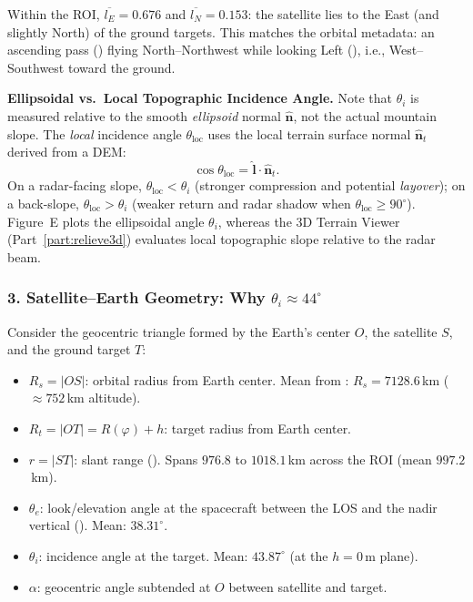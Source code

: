 \documentclass[11pt,a4paper]{article}
\begin{document}
Within the ROI, $\overline{l_E} = 0.676$ and $\overline{l_N} = 0.153$: the satellite lies to the East (and slightly North) of the ground targets. This matches the orbital metadata: an ascending pass () flying North--Northwest while looking Left (), i.e., West--Southwest toward the ground.

\textbf{Ellipsoidal vs.\ Local Topographic Incidence Angle.} Note that $\theta_i$ is measured relative to the smooth \emph{ellipsoid} normal $\hat{\mathbf{n}}$, not the actual mountain slope. The \emph{local} incidence angle $\theta_{\text{loc}}$ uses the local terrain surface normal $\hat{\mathbf{n}}_t$ derived from a DEM:
\begin{equation}
  \cos\theta_{\text{loc}} = \hat{\mathbf{l}}\cdot\hat{\mathbf{n}}_t .
\end{equation}
On a radar-facing slope, $\theta_{\text{loc}} < \theta_i$ (stronger compression and potential \emph{layover}); on a back-slope, $\theta_{\text{loc}} > \theta_i$ (weaker return and radar shadow when $\theta_{\text{loc}} \ge 90^\circ$). Figure~E plots the ellipsoidal angle $\theta_i$, whereas the 3D Terrain Viewer (Part~\ref{part:relieve3d}) evaluates local topographic slope relative to the radar beam.

\subsubsection*{3. Satellite--Earth Geometry: Why $\theta_i \approx 44^\circ$}
Consider the geocentric triangle formed by the Earth's center $O$, the satellite $S$, and the ground target $T$:
\begin{itemize}
  \item $R_s = |OS|$: orbital radius from Earth center. Mean from : $R_s = 7128.6$\,km ($\approx 752$\,km altitude).
  \item $R_t = |OT| = R(\varphi) + h$: target radius from Earth center.
  \item $r = |ST|$: slant range (). Spans $976.8$ to $1018.1$\,km across the ROI (mean $997.2$\,km).
  \item $\theta_e$: look/elevation angle at the spacecraft between the LOS and the nadir vertical (). Mean: $38.31^\circ$.
  \item $\theta_i$: incidence angle at the target. Mean: $43.87^\circ$ (at the $h=0$\,m plane).
  \item $\alpha$: geocentric angle subtended at $O$ between satellite and target.
\end{itemize}
\end{document}
